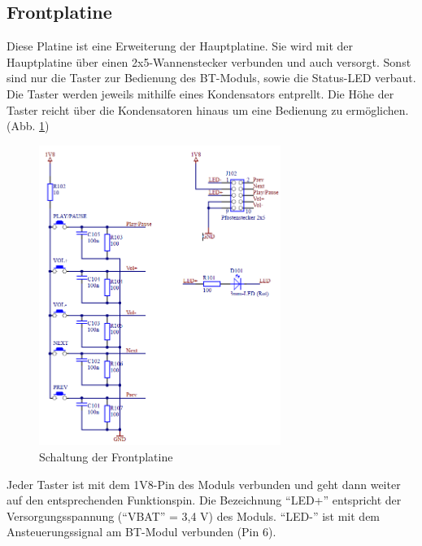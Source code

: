 \subsection*{Frontplatine} \label{subsec:5.3.9}
Diese Platine ist eine Erweiterung der Hauptplatine.
Sie wird mit der Hauptplatine über einen 2x5-Wannenstecker verbunden und auch versorgt.
Sonst sind nur die Taster zur Bedienung des BT-Moduls, sowie die Status-LED verbaut.
\\

Die Taster werden jeweils mithilfe eines Kondensators entprellt.
Die Höhe der Taster reicht über die Kondensatoren hinaus um eine Bedienung zu ermöglichen. (Abb. \ref{fig:5.3.9.2.1})
\begin{figure} [H]
	\centering
	\includegraphics[width=0.7\textwidth]{img/BTModul/front_sch.png}
	\caption{Schaltung der Frontplatine}\label {fig:5.3.9.2.1}
\end{figure}
Jeder Taster ist mit dem 1V8-Pin des Moduls verbunden und geht dann weiter auf den entsprechenden Funktionspin.
Die Bezeichnung \enquote{LED+} entspricht der Versorgungsspannung (\enquote{VBAT} = 3,4 V) des Moduls.
\enquote{LED-} ist mit dem \mbox{Ansteuerungssignal} am BT-Modul verbunden (Pin 6).

